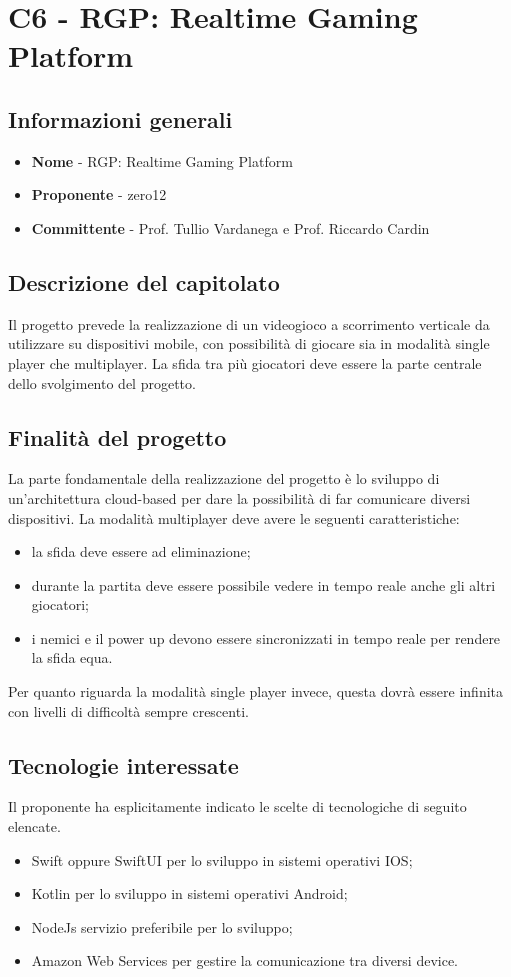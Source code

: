 \chapter{C6 - RGP: Realtime Gaming Platform}
\section{Informazioni generali}
\begin{itemize}
	\item \textbf{Nome} - RGP: Realtime Gaming Platform
	\item \textbf{Proponente} - zero12
	\item \textbf{Committente} - Prof. Tullio Vardanega e Prof. Riccardo Cardin
\end{itemize}
\section{Descrizione del capitolato}
Il progetto prevede la realizzazione di un videogioco a scorrimento verticale da utilizzare su dispositivi mobile, con possibilità di giocare sia in modalità single player che multiplayer. La sfida tra più giocatori deve essere la parte centrale dello svolgimento del progetto.
\section{Finalità del progetto}
La parte fondamentale della realizzazione del progetto è lo sviluppo di un'architettura cloud-based  per dare la possibilità di far comunicare diversi dispositivi. La modalità multiplayer deve avere le seguenti caratteristiche:
\begin{itemize}
	\item la sfida deve essere ad eliminazione;
	\item durante la partita deve essere possibile vedere in tempo reale anche gli altri giocatori;
	\item i nemici e il power up devono essere sincronizzati in tempo reale per rendere la sfida equa.
\end{itemize}
Per quanto riguarda la modalità single player invece, questa dovrà essere infinita con livelli di difficoltà sempre crescenti.
\section{Tecnologie interessate}
Il proponente ha esplicitamente indicato le scelte di tecnologiche di seguito elencate.
\begin{itemize}
	\item Swift oppure SwiftUI per lo sviluppo in sistemi operativi IOS;
	\item Kotlin per lo sviluppo in sistemi operativi Android;
	\item NodeJs servizio preferibile per lo sviluppo;
	\item Amazon Web Services per gestire la comunicazione tra diversi device.
\end{itemize}
